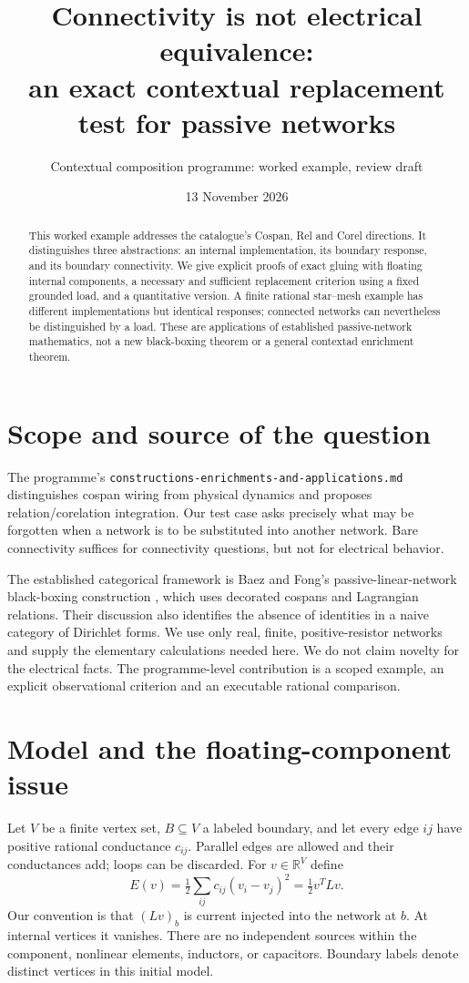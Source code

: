 \documentclass[11pt]{article}
\title{Connectivity is not electrical equivalence:\\an exact contextual replacement test for passive networks}
\author{Contextual composition programme: worked example, review draft}
\date{13 November 2026}
\begin{document}
\maketitle
\begin{abstract}
This worked example addresses the catalogue's Cospan, Rel and Corel directions. It distinguishes three abstractions: an internal implementation, its boundary response, and its boundary connectivity. We give explicit proofs of exact gluing with floating internal components, a necessary and sufficient replacement criterion using a fixed grounded load, and a quantitative version. A finite rational star--mesh example has different implementations but identical responses; connected networks can nevertheless be distinguished by a load. These are applications of established passive-network mathematics, not a new black-boxing theorem or a general contextad enrichment theorem.
\end{abstract}
\section{Scope and source of the question}
The programme's \texttt{constructions-enrichments-and-applications.md} distinguishes cospan wiring from physical dynamics and proposes relation/corelation integration. Our test case asks precisely what may be forgotten when a network is to be substituted into another network. Bare connectivity suffices for connectivity questions, but not for electrical behavior.

The established categorical framework is Baez and Fong's passive-linear-network black-boxing construction \cite{BF}, which uses decorated cospans and Lagrangian relations. Their discussion also identifies the absence of identities in a naive category of Dirichlet forms. We use only real, finite, positive-resistor networks and supply the elementary calculations needed here. We do not claim novelty for the electrical facts. The programme-level contribution is a scoped example, an explicit observational criterion and an executable rational comparison.

\section{Model and the floating-component issue}
Let $V$ be a finite vertex set, $B\subseteq V$ a labeled boundary, and let every edge $ij$ have positive rational conductance $c_{ij}$. Parallel edges are allowed and their conductances add; loops can be discarded. For $v\in\mathbb R^V$ define
\[E(v)=\tfrac12\sum_{ij}c_{ij}(v_i-v_j)^2=\tfrac12v^TLv.\]
Our convention is that $(Lv)_b$ is current injected into the network at $b$. At internal vertices it vanishes. There are no independent sources within the component, nonlinear elements, inductors, or capacitors. Boundary labels denote distinct vertices in this initial model.
\end{document}
